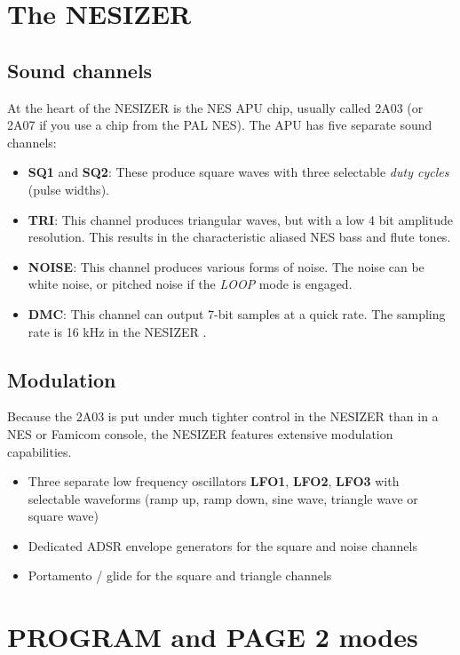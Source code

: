 \documentclass[a4paper, 12p, titlepaget]{book}
\newcommand \name {NESIZER }
\newcommand {\lbl}[1] {\emph{\footnotesize #1}}
\begin{document}
\section{The NESIZER}

\subsection{Sound channels}

At the heart of the \name is the NES APU chip, usually called 2A03 (or 2A07 if you use a chip from the PAL NES). The APU has five separate sound channels:

\begin{itemize}
\item \textbf{SQ1} and \textbf{SQ2}: These produce square waves with three selectable \emph{duty cycles} (pulse widths).
\item \textbf{TRI}: This channel produces triangular waves, but with a low 4 bit amplitude resolution. This results in the characteristic aliased NES bass and flute tones.
\item \textbf{NOISE}: This channel produces various forms of noise. The noise can be white noise, or pitched noise if the \lbl{LOOP} mode is engaged.
\item \textbf{DMC}: This channel can output 7-bit samples at a quick rate. The sampling rate is 16 kHz in the \name.
\end{itemize}

\subsection{Modulation}

Because the 2A03 is put under much tighter control in the \name than in a NES or Famicom console, the \name features extensive modulation capabilities.

\begin{itemize}
\item Three separate low frequency oscillators \textbf{LFO1}, \textbf{LFO2}, \textbf{LFO3} with selectable waveforms (ramp up, ramp down, sine wave, triangle wave or square wave)
\item Dedicated ADSR envelope generators for the square and noise channels
\item Portamento / glide for the square and triangle channels
\end{itemize}

\section{PROGRAM and PAGE 2 modes}
\end{document}
